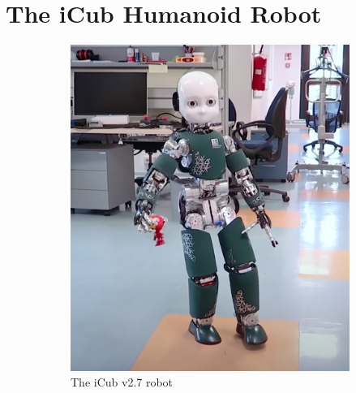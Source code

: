 \section{The iCub Humanoid Robot\label{sec:icub}}

\begin{figure}[tpb]
\centering
    \begin{subfigure}[b]{0.48\textwidth}
        \centering
        \includegraphics[width=\textwidth]{chapter_introduction/figures/iCubGenova04.png}
        \caption{The iCub v2.7 robot}
        \label{fig:iCubGenova04}
    \end{subfigure}
    \hfill
    \begin{subfigure}[b]{0.48\textwidth}
        \centering

\end{subfigure}
\end{figure}
